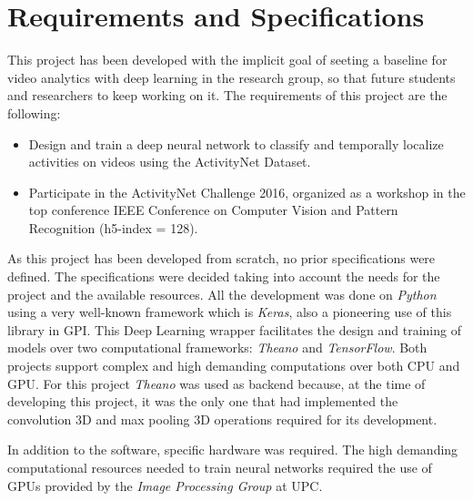 \section{Requirements and Specifications}

This project has been developed with the implicit goal of seeting a baseline for video analytics with deep learning in the research group, so that future students and researchers to keep working on it. The requirements of this project are the following:
\begin{itemize}
    \item Design and train a deep neural network to classify and temporally localize activities on videos using the ActivityNet Dataset.
    \item Participate in the ActivityNet Challenge 2016, organized as a workshop in the top conference IEEE Conference on Computer Vision and Pattern Recognition (h5-index = 128).
\end{itemize}


As this project has been developed from scratch, no prior specifications were defined. The specifications were decided taking into account the needs for the project and the available resources. All the development was done on \textit{Python} using a very well-known framework which is \textit{Keras}, also a pioneering use of this library in GPI. This Deep Learning wrapper facilitates the design and training of models over two computational frameworks: \textit{Theano}\cite{theano2016theano} and \textit{TensorFlow}\cite{abadi2016tensorflow}. Both  projects support complex and high demanding computations over both CPU and GPU. For this project \textit{Theano} was used as backend because, at the time of developing this project, it was the only one that had implemented the convolution 3D and max pooling 3D operations required for its development.

In addition to the software, specific hardware was required. The high demanding computational resources needed to train neural networks required the use of GPUs provided by the \textit{Image Processing Group} at UPC.


